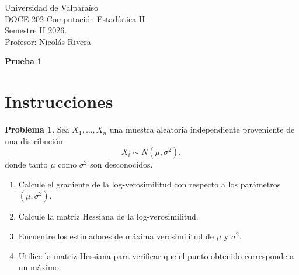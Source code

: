 \documentclass[a4paper,12 pt]{article}
\theoremstyle{definition}
\newtheorem{problema}{Problema}
\begin{document}
	
	\begin{flushleft}
		\Large{ Universidad de Valpara\'iso \\
			DOCE-202 Computación Estadística II \\
			Semestre II 2026.\\
			Profesor: Nicolás Rivera
		}
	\end{flushleft}
	
	\begin{center}
		{\Large \bf Prueba 1}
	\end{center}
	
	
	
	\section*{Instrucciones}

	
		\begin{problema}
		
		Sea \(X_1,\ldots,X_n\) una muestra aleatoria independiente proveniente de una distribución
		\[
		X_i \sim N(\mu,\sigma^2),
		\]
		donde tanto \(\mu\) como \(\sigma^2\) son desconocidos.
		
		\begin{enumerate}
						
			\item Calcule el gradiente de la log-verosimilitud con respecto a los parámetros \((\mu,\sigma^2)\).
			
			\item Calcule la matriz Hessiana de la log-verosimilitud.
			
			\item Encuentre los estimadores de máxima verosimilitud de \(\mu\) y \(\sigma^2\).
			
			\item Utilice la matriz Hessiana para verificar que el punto obtenido corresponde a un máximo.
		\end{enumerate}
		
	\end{problema}
\end{document}
